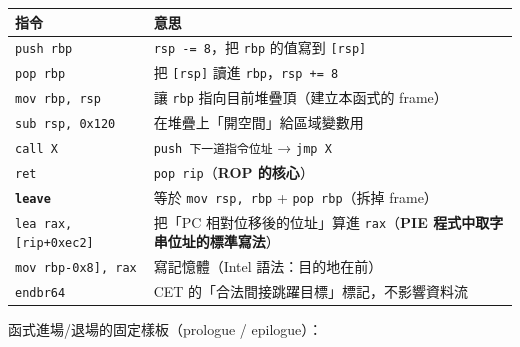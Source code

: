 \documentclass[10pt,a4paper]{article}
\newcounter{none}
\begin{document}
{\def\LTcaptype{none} %
\begin{longtable}[]{@{}
  >{\raggedright\arraybackslash}p{}
  >{\raggedright\arraybackslash}p{}@{}}
\toprule\noalign{}
\begin{minipage}[b]{\linewidth}\raggedright
指令
\end{minipage} & \begin{minipage}[b]{\linewidth}\raggedright
意思
\end{minipage} \\
\midrule\noalign{}
\endhead
\bottomrule\noalign{}
\endlastfoot
\texttt{push\ \allowbreak{}rbp} & \texttt{rsp\ \allowbreak{}-=\ \allowbreak{}8}，把 \texttt{rbp} 的值寫到
\texttt{{[}rsp{]}} \\
\texttt{pop\ \allowbreak{}rbp} & 把 \texttt{{[}rsp{]}} 讀進
\texttt{rbp}，\texttt{rsp\ \allowbreak{}+=\ \allowbreak{}8} \\
\texttt{mov\ \allowbreak{}rbp,\allowbreak{}\ \allowbreak{}rsp} & 讓 \texttt{rbp} 指向目前堆疊頂（建立本函式的
frame） \\
\texttt{sub\ \allowbreak{}rsp,\allowbreak{}\ \allowbreak{}0x120} & 在堆疊上「開空間」給區域變數用 \\
\texttt{call\ \allowbreak{}X} & \texttt{push\ \allowbreak{}下一道指令位址} → \texttt{jmp\ \allowbreak{}X} \\
\texttt{ret} & \texttt{pop\ \allowbreak{}rip}（\textbf{ROP 的核心}） \\
\textbf{\texttt{leave}} & 等於 \texttt{mov\ \allowbreak{}rsp,\allowbreak{}\ \allowbreak{}rbp} +
\texttt{pop\ \allowbreak{}rbp}（拆掉 frame） \\
\texttt{lea\ \allowbreak{}rax,{[}rip+0xec2{]}} & 把「PC 相對位移後的位址」算進
\texttt{rax}（\textbf{PIE 程式中取字串位址的標準寫法}） \\
\texttt{mov\ \allowbreak{}{[}rbp-\allowbreak{}0x8{]},\allowbreak{}\ \allowbreak{}rax} & 寫記憶體（Intel
語法：目的地在前） \\
\texttt{endbr64} & CET 的「合法間接跳躍目標」標記，不影響資料流 \\
\end{longtable}
}

函式進場/退場的固定樣板（prologue / epilogue）：
\end{document}
